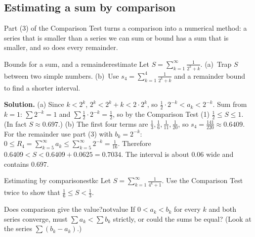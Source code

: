 \documentclass[11pt]{article}
\begin{document}
\subsection*{Estimating a sum by comparison}

Part (3) of the Comparison Test turns a comparison into a numerical method: a series that is smaller than a series we can sum or bound has a sum that is smaller, and so does every remainder.

\begin{exmp}{Bounds for a sum, and a remainder}{estimate}
Let $S=\displaystyle\sum_{k=1}^\infty\frac1{2^k+k}$. (a)~Trap $S$ between two simple numbers. (b)~Use $s_4=\sum_{k=1}^4\frac1{2^k+k}$ and a remainder bound to find a shorter interval.

\textbf{Solution.} (a) Since $k<2^k$, $2^k<2^k+k<2\cdot2^k$, so $\frac1{2}\cdot2^{-k}<a_k<2^{-k}$. Sum from $k=1$: $\sum2^{-k}=1$ and $\sum\frac12\cdot2^{-k}=\frac12$, so by the Comparison Test (1) $\frac12\le S\le1$. (In fact $S\approx0.697$.)
(b) The first four terms are $\frac13,\frac16,\frac1{11},\frac1{20}$, so $s_4=\frac{141}{220}\approx0.6409$. For the remainder use part (3) with $b_k=2^{-k}$: $0\le R_4=\sum_{k=5}^\infty a_k\le\sum_{k=5}^\infty2^{-k}=\frac1{16}$. Therefore $0.6409<S<0.6409+0.0625=0.7034$. The interval is about $0.06$ wide and contains $0.697$.
\end{exmp}

\begin{kc}{Estimating by comparison}{estkc}
Let $S=\displaystyle\sum_{k=1}^\infty\frac1{4^k+1}$. Use the Comparison Test twice to show that $\frac16\le S<\frac13$.
\end{kc}

\begin{think}{Does comparison give the value?}{notvalue}
If $0<a_k<b_k$ for every $k$ and both series converge, must $\sum a_k<\sum b_k$ strictly, or could the sums be equal? (Look at the series $\sum(b_k-a_k)$.)
\end{think}
\end{document}
